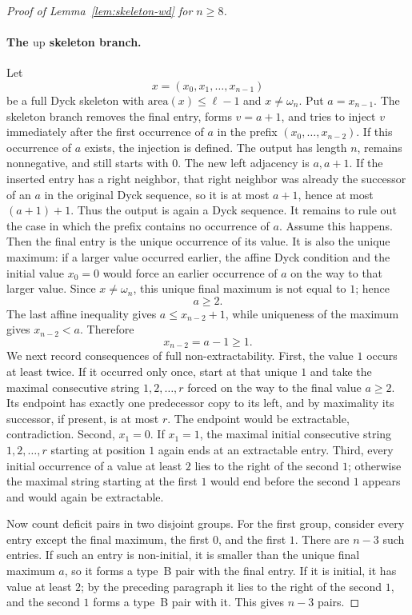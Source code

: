 \documentclass[11pt]{article}
\theoremstyle{plain}
\theoremstyle{definition}
\theoremstyle{remark}
\newcommand{\area}{\mathrm{area}}
\begin{document}
\begin{proof}[Proof of Lemma~\ref{lem:skeleton-wd} for \(n\ge 8\)]
\paragraph{The \(\mathrm{up}\) skeleton branch.}
Let
\[
  x=(x_0,x_1,\ldots,x_{n-1})
\]
be a full Dyck skeleton with \(\area(x)\le \ell-1\) and \(x\ne\omega_n\).  Put
\(a=x_{n-1}\).  The skeleton branch removes the final entry, forms
\(v=a+1\), and tries to inject \(v\) immediately after the first occurrence of
\(a\) in the prefix \((x_0,\ldots,x_{n-2})\).
If this occurrence of \(a\) exists, the injection is defined.  The output has
length \(n\), remains nonnegative, and still starts with \(0\).  The new left
adjacency is \(a,a+1\).  If the inserted entry has a right neighbor, that right
neighbor was already the successor of an \(a\) in the original Dyck sequence,
so it is at most \(a+1\), hence at most \((a+1)+1\).  Thus the output is again
a Dyck sequence.
It remains to rule out the case in which the prefix contains no occurrence of
\(a\).  Assume this happens.  Then the final entry is the unique occurrence of
its value.  It is also the unique maximum: if a larger value occurred earlier,
the affine Dyck condition and the initial value \(x_0=0\) would force an
earlier occurrence of \(a\) on the way to that larger value.  Since
\(x\ne\omega_n\), this unique final maximum is not equal to \(1\); hence
\[
  a\ge 2.
\]
The last affine inequality gives \(a\le x_{n-2}+1\), while uniqueness of the
maximum gives \(x_{n-2}<a\).  Therefore
\[
  x_{n-2}=a-1\ge 1.
\]
We next record consequences of full non-extractability.  First, the value
\(1\) occurs at least twice.  If it occurred only once, start at that unique
\(1\) and take the maximal consecutive string \(1,2,\ldots,r\) forced on the
way to the final value \(a\ge2\).  Its endpoint has exactly one predecessor
copy to its left, and by maximality its successor, if present, is at most
\(r\).  The endpoint would be extractable, contradiction.  Second, \(x_1=0\).
If \(x_1=1\), the maximal initial consecutive string \(1,2,\ldots,r\) starting
at position \(1\) again ends at an extractable entry.  Third, every initial
occurrence of a value at least \(2\) lies to the right of the second \(1\);
otherwise the maximal string starting at the first \(1\) would end before the
second \(1\) appears and would again be extractable.

Now count deficit pairs in two disjoint groups.  For the first group, consider
every entry except the final maximum, the first \(0\), and the first \(1\).
There are \(n-3\) such entries.  If such an entry is non-initial, it is smaller
than the unique final maximum \(a\), so it forms a type~B pair with the final
entry.  If it is initial, it has value at least \(2\); by the preceding
paragraph it lies to the right of the second \(1\), and the second \(1\) forms
a type~B pair with it.  This gives \(n-3\) pairs.


\end{proof}
\end{document}

